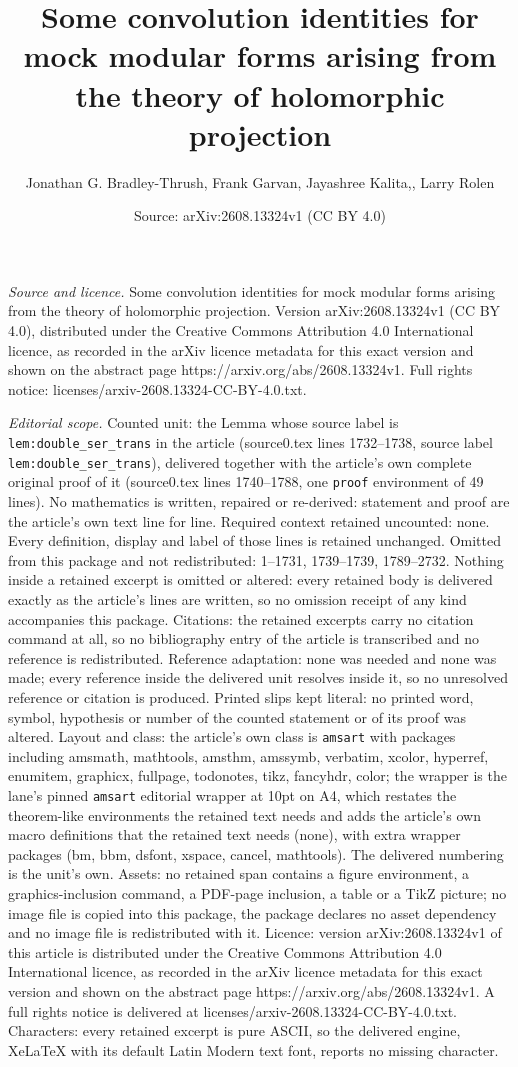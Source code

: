 \documentclass[10pt,a4paper]{amsart}
\title[Some convolution identities for mock modular forms arising f]{Some convolution identities for mock modular forms arising from the theory of holomorphic projection}
\author{Jonathan G. Bradley-Thrush, Frank Garvan, Jayashree Kalita,, Larry Rolen}
\date{Source: arXiv:2608.13324v1 (CC BY 4.0)}
\begin{document}
\maketitle

\noindent\emph{Source and licence.} Some convolution identities for mock modular forms arising from the theory of holomorphic projection. Version arXiv:2608.13324v1 (CC BY 4.0), distributed under the Creative Commons Attribution 4.0 International licence, as recorded in the arXiv licence metadata for this exact version and shown on the abstract page https://arxiv.org/abs/2608.13324v1. Full rights notice: licenses/arxiv-2608.13324-CC-BY-4.0.txt.\par\smallskip

\noindent\textit{Editorial scope.} Counted unit: the Lemma whose source label is \texttt{lem:double\_ser\_trans} in the article (source0.tex lines 1732--1738, source label \texttt{lem:double\_ser\_trans}), delivered together with the article's own complete original proof of it (source0.tex lines 1740--1788, one \texttt{proof} environment of 49 lines). No mathematics is written, repaired or re-derived: statement and proof are the article's own text line for line. Required context retained uncounted: none. Every definition, display and label of those lines is retained unchanged. Omitted from this package and not redistributed: 1--1731, 1739--1739, 1789--2732. Nothing inside a retained excerpt is omitted or altered: every retained body is delivered exactly as the article's lines are written, so no omission receipt of any kind accompanies this package. Citations: the retained excerpts carry no citation command at all, so no bibliography entry of the article is transcribed and no reference is redistributed. Reference adaptation: none was needed and none was made; every reference inside the delivered unit resolves inside it, so no unresolved reference or citation is produced. Printed slips kept literal: no printed word, symbol, hypothesis or number of the counted statement or of its proof was altered. Layout and class: the article's own class is \texttt{amsart} with packages including amsmath, mathtools, amsthm, amssymb, verbatim, xcolor, hyperref, enumitem, graphicx, fullpage, todonotes, tikz, fancyhdr, color; the wrapper is the lane's pinned \texttt{amsart} editorial wrapper at 10pt on A4, which restates the theorem-like environments the retained text needs and adds the article's own macro definitions that the retained text needs (none), with extra wrapper packages (bm, bbm, dsfont, xspace, cancel, mathtools). The delivered numbering is the unit's own. Assets: no retained span contains a figure environment, a graphics-inclusion command, a PDF-page inclusion, a table or a TikZ picture; no image file is copied into this package, the package declares no asset dependency and no image file is redistributed with it. Licence: version arXiv:2608.13324v1 of this article is distributed under the Creative Commons Attribution 4.0 International licence, as recorded in the arXiv licence metadata for this exact version and shown on the abstract page https://arxiv.org/abs/2608.13324v1. A full rights notice is delivered at licenses/arxiv-2608.13324-CC-BY-4.0.txt. Characters: every retained excerpt is pure ASCII, so the delivered engine, XeLaTeX with its default Latin Modern text font, reports no missing character.
\end{document}
